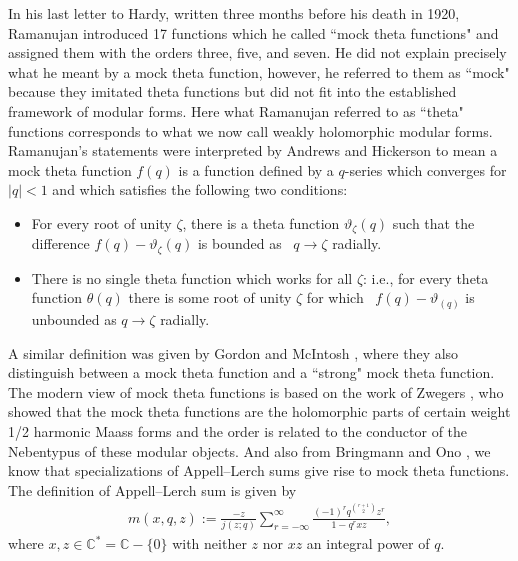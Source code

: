 \documentclass[pdftex]{sigma}
\numberwithin{equation}{section}
\begin{document}
In his last letter to Hardy, written three months before his death in 1920, Ramanujan \cite{R} introduced 17 functions which he called ``mock theta functions" and assigned them with the orders three, five, and seven. He did not explain precisely what he meant by a mock theta function, however, he referred to them as ``mock" because they imitated theta functions but did not fit into the established framework of modular forms. Here what Ramanujan referred to as ``theta" functions corresponds to what we now call weakly holomorphic modular forms. Ramanujan's
statements were interpreted by Andrews and Hickerson \cite{AH} to mean a mock theta function $f(q)$ is a function defined by a $q$-series which converges for $|q| < 1$ and which satisfies the following two conditions:
\begin{itemize}\itemsep=0pt
\item[(0)] For every root of unity $\zeta$, there is a theta function $\vartheta_\zeta(q)$ such that
 the difference $f(q)-\vartheta_\zeta(q)$ is bounded as ~$q\rightarrow\zeta$ radially.

\item[(1)] There is no single theta function which works for all $\zeta$: i.e., for every
 theta function $\theta(q)$ there is some root of unity $\zeta$ for which ~$f(q)-\vartheta_(q)$ is
 unbounded as $q\rightarrow\zeta$ radially.
\end{itemize}
A similar definition was given by Gordon and McIntosh \cite{GM1,GM}, where they
also distinguish between a mock theta function and a ``strong" mock theta function.
The modern view of mock theta functions is based on the work of Zwegers \cite{Z,Z1},
who showed that the mock theta functions are the holomorphic parts of certain weight 1/2 harmonic Maass forms and the order is related to the conductor of the Nebentypus of these modular objects. And also from Bringmann and Ono \cite{BO1,BO2}, we know that specializations of Appell--Lerch sums give rise to mock theta functions. The definition of Appell--Lerch sum is given by
\begin{align*}%
m(x,q,z):=\frac{-z}{j(z;q)}\sum_{r=-\infty}^{\infty}
\frac{(-1)^{r}q^{r+1\choose 2}z^r}{1-q^rxz},
\end{align*}
where $x,z\in\mathbb{C}^{*}=\mathbb{C}-\{0\}$ with neither $z$ nor $xz$ an integral power of $q$.
\end{document}
